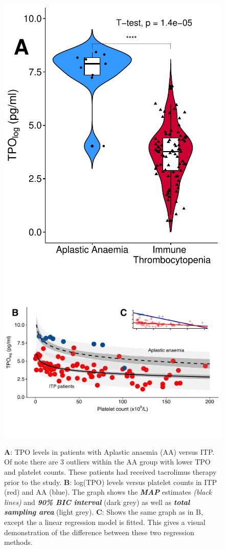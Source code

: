 \documentclass[landscape,a0paper,fontscale=0.285]{beamer} %
\newlength{\twocolwid}
\begin{document}
\begin{frame}[t]
\begin{columns}[t]
\begin{column}{\twocolwid}
\begin{figure}%
    \centering
    {{\includegraphics[width=0.29\linewidth]{fig/AA_vs_ITP_2.pdf}}}%
    \qquad
    {{\includegraphics[width=0.67\linewidth]{fig/bayes_model2.pdf}}}%
    \caption{\textbf{A}: TPO levels in patients with Aplastic anaemia (AA) versus ITP. Of note there are 3 outliers within the AA group with lower TPO and platelet counts. These patients had received tacrolimus therapy prior to the study. \textbf{B}: log(TPO) levels versus platelet counts in ITP (red) and AA (blue). The graph shows the \textit{\textbf{MAP}} estimates \emph{(black lines)} and \textit{\textbf{90\% BIC interval}} (dark grey) as well as \textit{\textbf{total sampling area}} (light grey). \textbf{C}: Shows the same graph as in B, except the a linear regression model is fitted. This gives a visual demonstration of the difference between these two regression methods.}%
    \label{fig:example}%
\end{figure}









\end{column}
\end{columns}
\end{frame}
\end{document}
